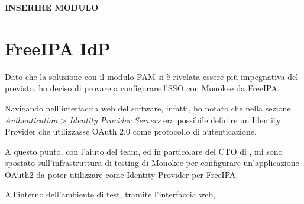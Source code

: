 \textbf{INSERIRE MODULO}


\section{FreeIPA IdP}

Dato che la soluzione con il modulo PAM si è rivelata essere più impegnativa del previsto, ho deciso di provare a configurare l'SSO con Monokee da FreeIPA. 

Navigando nell'interfaccia web del software, infatti, ho notato che nella sezione \textit{Authentication} > \textit{Identity Provider Servers} era possibile definire un Identity Provider che utilizzasse OAuth 2.0 come protocollo di autenticazione.

A questo punto, con l'aiuto del team, ed in particolare del CTO di \myAzienda, mi sono spostato sull'infrastruttura di testing di Monokee per configurare un'applicazione OAuth2 da poter utilizzare come Identity Provider per FreeIPA.

All'interno dell'ambiente di test, tramite l'interfaccia web, 